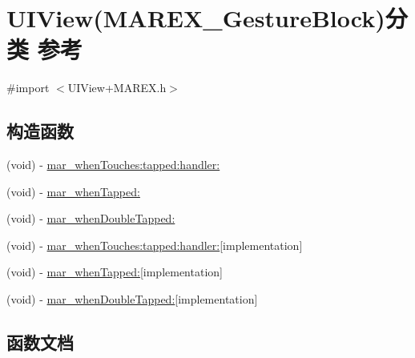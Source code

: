 \hypertarget{category_u_i_view_07_m_a_r_e_x___gesture_block_08}{}\section{U\+I\+View(M\+A\+R\+E\+X\+\_\+\+Gesture\+Block)分类 参考}
\label{category_u_i_view_07_m_a_r_e_x___gesture_block_08}


{\ttfamily \#import $<$U\+I\+View+\+M\+A\+R\+E\+X.\+h$>$}

\subsection*{构造函数}
\begin{DoxyCompactItemize}
\item 
(void) -\/ \hyperlink{category_u_i_view_07_m_a_r_e_x___gesture_block_08_a4c9a3fceb9b732e8f367d7b0bc0eb6b3}{mar\+\_\+when\+Touches\+:tapped\+:handler\+:}
\item 
(void) -\/ \hyperlink{category_u_i_view_07_m_a_r_e_x___gesture_block_08_ab246996814938493bb15e26cf7cd541e}{mar\+\_\+when\+Tapped\+:}
\item 
(void) -\/ \hyperlink{category_u_i_view_07_m_a_r_e_x___gesture_block_08_a16c18203bf4bbfc66e15f42cc946696b}{mar\+\_\+when\+Double\+Tapped\+:}
\item 
(void) -\/ \hyperlink{category_u_i_view_07_m_a_r_e_x___gesture_block_08_ac93ca369cd1a4bb324347ef3aad7efc8}{mar\+\_\+when\+Touches\+:tapped\+:handler\+:}{\ttfamily  \mbox{[}implementation\mbox{]}}
\item 
(void) -\/ \hyperlink{category_u_i_view_07_m_a_r_e_x___gesture_block_08_af56cb4afe508c5f1230b784d8232b722}{mar\+\_\+when\+Tapped\+:}{\ttfamily  \mbox{[}implementation\mbox{]}}
\item 
(void) -\/ \hyperlink{category_u_i_view_07_m_a_r_e_x___gesture_block_08_ac87dd422ab8e224e31699808641785cb}{mar\+\_\+when\+Double\+Tapped\+:}{\ttfamily  \mbox{[}implementation\mbox{]}}
\end{DoxyCompactItemize}


\subsection{函数文档}
\mbox{\label{category_u_i_view_07_m_a_r_e_x___gesture_block_08_a16c18203bf4bbfc66e15f42cc946696b}} 
